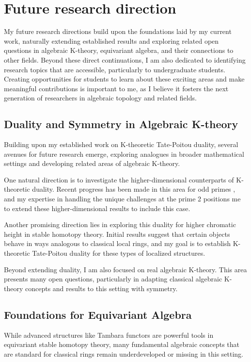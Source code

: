 \documentclass[11pt]{article}
\begin{document}
\section{Future research direction}
My future research directions build upon the foundations laid by my current work, naturally extending established results and exploring related open questions in algebraic K-theory, equivariant algebra, and their connections to other fields. Beyond these direct continuations, I am also dedicated to identifying research topics that are accessible, particularly to undergraduate students. Creating opportunities for students to learn about these exciting areas and make meaningful contributions is important to me, as I believe it fosters the next generation of researchers in algebraic topology and related fields.

\subsection*{Duality and Symmetry in Algebraic K-theory}
Building upon my established work on K-theoretic Tate-Poitou duality, several avenues for future research emerge, exploring analogues in broader mathematical settings and developing related areas of algebraic K-theory.

One natural direction is to investigate the higher-dimensional counterparts of K-theoretic duality.  Recent progress has been made in this area for odd primes \cite{Braunling}, and my expertise in handling the unique challenges at the prime 2 positions me to extend these higher-dimensional results to include this case.

Another promising direction lies in exploring this duality for higher chromatic height in stable homotopy theory. Initial results \cite{HRW} suggest that certain objects behave in ways analogous to classical local rings, and my goal is to establish K-theoretic Tate-Poitou duality for these types of localized structures.

Beyond extending duality, I am also focused on real algebraic K-theory. This area presents many open questions, particularly in adapting classical algebraic K-theory concepts and results to this setting with symmetry.


\subsection*{Foundations for Equivariant Algebra}
While advanced structures like Tambara functors are powerful tools in equivariant stable homotopy theory, many fundamental algebraic concepts that are standard for classical rings remain  underdeveloped or missing in this setting. 
\end{document}
